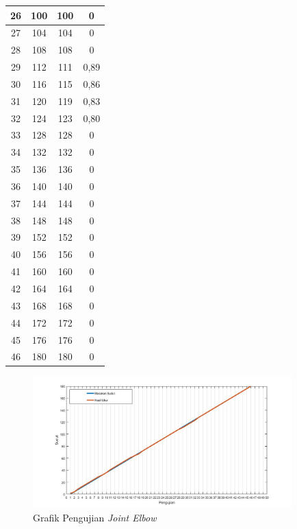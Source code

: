 \begin{table}[]
\begin{tabular}{|c|c|c|c|}
 		26 & 100     & 100      & 0           \\ \hline
 		27 & 104     & 104      & 0           \\ \hline
 		28 & 108     & 108      & 0           \\ \hline
 		29 & 112     & 111      & 0,89 \\ \hline
 		30 & 116     & 115      & 0,86 \\ \hline
 		31 & 120     & 119      & 0,83 \\ \hline
 		32 & 124     & 123      & 0,80 \\ \hline
 		33 & 128     & 128      & 0           \\ \hline
 		34 & 132     & 132      & 0           \\ \hline
 		35 & 136     & 136      & 0           \\ \hline
 		36 & 140     & 140      & 0           \\ \hline
 		37 & 144     & 144      & 0           \\ \hline
 		38 & 148     & 148      & 0           \\ \hline
 		39 & 152     & 152      & 0           \\ \hline
 		40 & 156     & 156      & 0           \\ \hline
 		41 & 160     & 160      & 0           \\ \hline
 		42 & 164     & 164      & 0           \\ \hline
 		43 & 168     & 168      & 0           \\ \hline
 		44 & 172     & 172      & 0           \\ \hline
 		45 & 176     & 176      & 0           \\ \hline
 		46 & 180     & 180      & 0           \\ \hline
 	\end{tabular}
 \end{table} 
 \begin{figure}[H]
 	\centering
 	\includegraphics[width=10cm]{gambar/pic_jointelbow.jpg}
 	\caption{Grafik Pengujian \textit{Joint Elbow}}
 	\label{pic.jointelbow}
 \end{figure}
 
